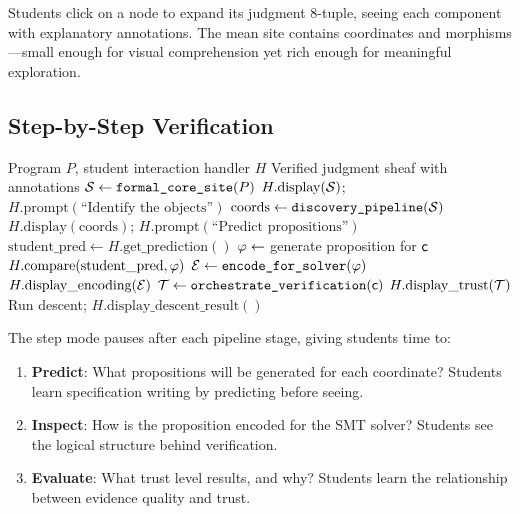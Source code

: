 \documentclass[11pt]{article}
\newcommand{\EduMode}{\textsc{EduMode}}
\begin{document}
Students click on a node to expand its judgment 8-tuple, seeing each component
with explanatory annotations. The mean site contains \compSiteMeanCoords{}
coordinates and \compSiteMeanMorphisms{} morphisms---small enough for visual
comprehension yet rich enough for meaningful exploration.

\subsection{Step-by-Step Verification}

\begin{algorithm}[t]
\caption{Step-by-Step Verification in \EduMode}
\label{alg:stepmode}
\begin{algorithmic}[1]
\REQUIRE Program $P$, student interaction handler $H$
\ENSURE Verified judgment sheaf with annotations
\STATE $\mathcal{S} \gets \texttt{formal\_core\_site}(P)$
\STATE $H.\text{display}(\mathcal{S})$; $H.\text{prompt}(\text{``Identify the objects''})$
\STATE $\text{coords} \gets \texttt{discovery\_pipeline}(\mathcal{S})$
\STATE $H.\text{display}(\text{coords})$; $H.\text{prompt}(\text{``Predict propositions''})$
  \STATE $\text{student\_pred} \gets H.\text{get\_prediction}()$
  \STATE $\varphi \gets$ generate proposition for $\mathsf{c}$
  \STATE $H.\text{compare}(\text{student\_pred}, \varphi)$
  \STATE $\mathcal{E} \gets \texttt{encode\_for\_solver}(\varphi)$
  \STATE $H.\text{display\_encoding}(\mathcal{E})$
  \STATE $\mathcal{T} \gets \texttt{orchestrate\_verification}(\mathsf{c})$
  \STATE $H.\text{display\_trust}(\mathcal{T})$
\ENDFOR
\STATE Run descent; $H.\text{display\_descent\_result}()$
\end{algorithmic}
\end{algorithm}

The step mode pauses after each pipeline stage, giving students time to:
\begin{enumerate}
  \item \textbf{Predict}: What propositions will be generated for each
        coordinate? Students learn specification writing by predicting before
        seeing.
  \item \textbf{Inspect}: How is the proposition encoded for the SMT solver?
        Students see the logical structure behind verification.
  \item \textbf{Evaluate}: What trust level results, and why? Students learn
        the relationship between evidence quality and trust.
\end{enumerate}
\end{document}
